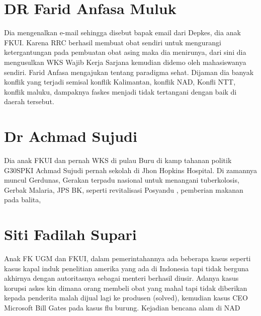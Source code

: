 \documentclass[11pt]{article}
\begin{document}
\section{DR Farid Anfasa Muluk}
\label{sec:org02caaa2}
Dia mengenalkan e-mail sehingga disebut bapak email dari Depkes, dia anak
FKUI. Karena RRC berhasil membuat obat sendiri untuk mengurangi ketergantungan
pada pembuatan obat asing maka dia menirunya, dari sini dia mengusulkan WKS
Wajib Kerja Sarjana kemudian didemo oleh mahasiswanya sendiri. Farid Anfasa
mengajukan tentang paradigma sehat. Dijaman dia banyak konflik yang terjadi
semisal konflik Kalimantan, konflik NAD, Konfli NTT, konflik maluku, dampaknya
faskes menjadi tidak tertangani dengan baik di daerah tersebut.

\section{Dr Achmad Sujudi}
\label{sec:org51e9cb0}
Dia anak FKUI dan pernah WKS di pulau Buru di kamp tahanan politik G30SPKI
Achmad Sujudi pernah sekolah di Jhon Hopkins Hospital. Di zamannya muncul
Gerdunas, Gerakan terpadu nasional untuk menangani tuberkolosis, Gerbak Malaria,
JPS BK, seperti revitalisasi Posyandu , pemberian makanan pada balita,

\section{Siti Fadilah Supari}
\label{sec:orgfa25092}
Anak FK UGM dan FKUI, dalam pemerintahannya ada beberapa kasus seperti kasus kapal induk
penelitian amerika yang ada di Indonesia tapi tidak berguna akhirnya dengan
autoritasnya sebagai menteri berhasil diusir. Adanya kasus korupsi askes kin
dimana orang membeli obat yang mahal tapi tidak diberikan kepada penderita malah
dijual lagi ke produsen (solved), kemudian kasus CEO Microsoft Bill Gates pada
kasus flu burung. Kejadian bencana alam di NAD
\end{document}
